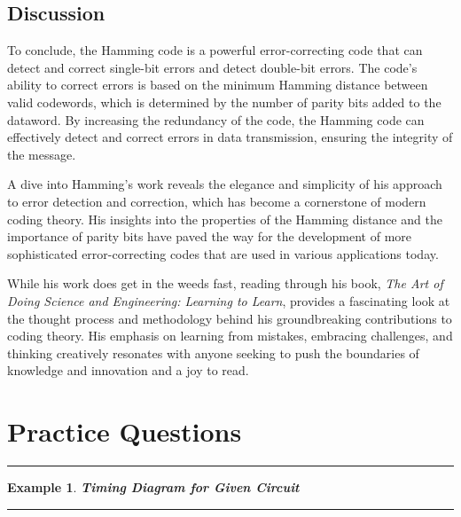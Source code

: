 \documentclass[12pt]{article}
\newtheorem{example}{Example}
\newenvironment{examp}
{\vspace{0.5cm}
 \hrule
\vspace{0.5cm}
\begin{example}}
{\hrule
\vspace{0.5cm}
\end{example}}
\begin{document}
\subsection*{Discussion}
To conclude, the Hamming code is a powerful error-correcting code that can detect and correct single-bit errors and detect double-bit errors. The code’s ability to correct errors is based on the minimum Hamming distance between valid codewords, which is determined by the number of parity bits added to the dataword. By increasing the redundancy of the code, the Hamming code can effectively detect and correct errors in data transmission, ensuring the integrity of the message.

A dive into Hamming's work reveals the elegance and simplicity of his approach to error detection and correction, which has become a cornerstone of modern coding theory. His insights into the properties of the Hamming distance and the importance of parity bits have paved the way for the development of more sophisticated error-correcting codes that are used in various applications today.

While his work does get in the weeds fast, reading through his book, \textit{The Art of Doing Science and Engineering: Learning to Learn}, provides a fascinating look at the thought process and methodology behind his groundbreaking contributions to coding theory. His emphasis on learning from mistakes, embracing challenges, and thinking creatively resonates with anyone seeking to push the boundaries of knowledge and innovation and a joy to read.

\section*{Practice Questions}
\begin{examp}
	\textbf{Timing Diagram for Given Circuit}
\end{examp}
\end{document}
